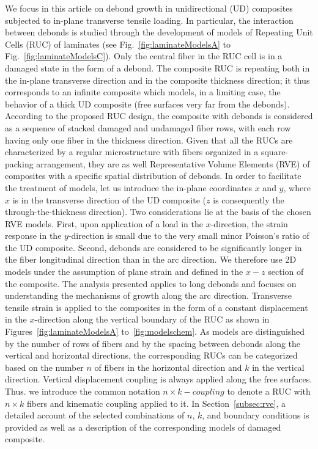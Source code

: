\documentclass[review]{elsarticle}
\begin{document}
We focus in this article on debond growth in unidirectional (UD) composites subjected to in-plane transverse tensile loading. In particular, the interaction between debonds is studied through the development of models of Repeating Unit Cells (RUC) of laminates (see Fig.~\ref{fig:laminateModelsA} to Fig.~\ref{fig:laminateModelsC}). Only the central fiber in the RUC cell is in a damaged state in the form of a debond. The composite RUC is repeating both in the in-plane transverse direction and in the composite thickness direction; it thus corresponds to an infinite composite which models, in a limiting case, the behavior of a thick UD composite (free surfaces very far from the debonds). According to the proposed RUC design, the composite with debonds is considered as a sequence of stacked damaged and undamaged fiber rows, with each row having only one fiber in the thickness direction. Given that all the RUCs are characterized by a regular microstructure with fibers organized in a square-packing arrangement, they are as well Representative Volume Elements (RVE) of composites with a specific spatial distribution of debonds. In order to facilitate the treatment of models, let us introduce the in-plane coordinates $x$ and $y$, where $x$ is in the transverse direction of the UD composite ($z$ is consequently the through-the-thickness direction). Two considerations lie at the basis of the chosen RVE models. First, upon application of a load in the $x$-direction, the strain response in the $y$-direction is small due to the very small minor Poisson's ratio of the UD composite. Second, debonds are considered to be significantly longer in the fiber longitudinal direction than in the arc direction. We therefore use 2D models under the assumption of plane strain and defined in the $x-z$ section of the composite.  The analysis presented applies to long debonds and focuses on understanding the mechanisms of growth along the arc direction. Transverse tensile strain is applied to the composites in the form of a constant displacement in the $x$-direction along the vertical boundary of the RUC as shown in  Figures~\ref{fig:laminateModelsA} to~\ref{fig:modelschem}. As models are distinguished by the number of rows of fibers and by the spacing between debonds along the vertical and horizontal directions, the corresponding RUCs can be categorized based on the number $n$ of fibers in the horizontal direction and $k$ in the vertical direction. Vertical displacement coupling is always applied along the free surfaces. Thus. we introduce the common notation $n\times k-coupling$ to denote a RUC with $n\times k$ fibers and kinematic coupling applied to it. In Section~\ref{subsec:rve}, a detailed account of the selected combinations of $n$, $k$, and boundary conditions is provided as well as a description of the corresponding models of damaged composite.
\end{document}

